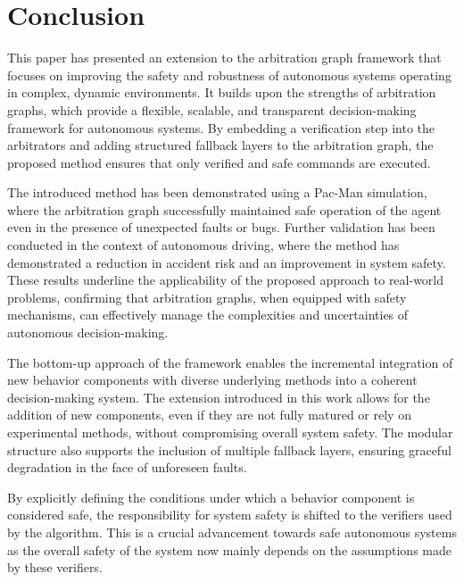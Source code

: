 \section{Conclusion}
This paper has presented an extension to the arbitration graph framework that focuses on improving the safety and robustness of autonomous systems operating in complex, dynamic environments.
It builds upon the strengths of arbitration graphs, which provide a flexible, scalable, and transparent decision-making framework for autonomous systems.
By embedding a verification step into the arbitrators and adding structured fallback layers to the arbitration graph,
the proposed method ensures that only verified and safe commands are executed.

The introduced method has been demonstrated using a Pac-Man simulation, where the arbitration graph successfully maintained safe operation of the agent even in the presence of unexpected faults or bugs.
Further validation has been conducted in the context of autonomous driving, where the method has demonstrated a reduction in accident risk and an improvement in system safety.
These results underline the applicability of the proposed approach to real-world problems,
confirming that arbitration graphs, when equipped with safety mechanisms,
can effectively manage the complexities and uncertainties of autonomous decision-making.

The bottom-up approach of the framework enables the incremental integration of new behavior components with diverse underlying methods into a coherent decision-making system.
The extension introduced in this work allows for the addition of new components, even if they are not fully matured or rely on experimental methods, without compromising overall system safety.
The modular structure also supports the inclusion of multiple fallback layers, ensuring graceful degradation in the face of unforeseen faults.

By explicitly defining the conditions under which a behavior component is considered safe,
the responsibility for system safety is shifted to the verifiers used by the algorithm.
This is a crucial advancement towards safe autonomous systems as
the overall safety of the system now mainly depends on the assumptions made by these verifiers.

